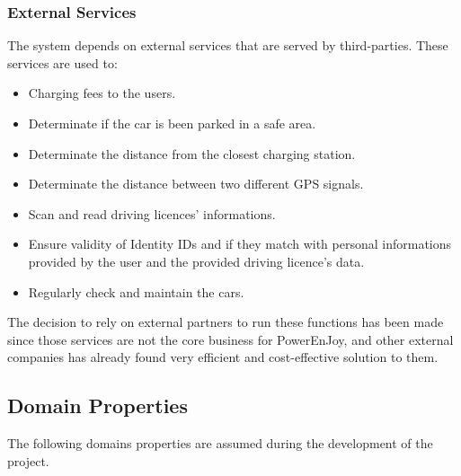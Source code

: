 \documentclass[11pt]{article} %
\newcommand{\pecomma}{PowerEnJoy, }
\begin{document}
  
  \subsubsection{External Services}
 The system depends on external services that are served by third-parties. These services are used to:
  \begin{itemize}
  	\item Charging fees to the users.
  	\item Determinate if the car is been parked in a safe area.
  	\item Determinate the distance from the closest charging station.
  	\item Determinate the distance between two different GPS signals.
	\item Scan and read driving licences' informations.
	\item Ensure validity of Identity IDs and if they match with personal informations provided by the user and the provided driving licence's data.
	\item Regularly check and maintain the cars.
  \end{itemize}
  	
 The decision to rely on external partners to run these functions has been made since those services are not the core business for \pecomma and other external companies has already found very efficient and cost-effective solution to them.

\subsection{Domain Properties}

The following domains properties are assumed during the development of the project.
\end{document}
